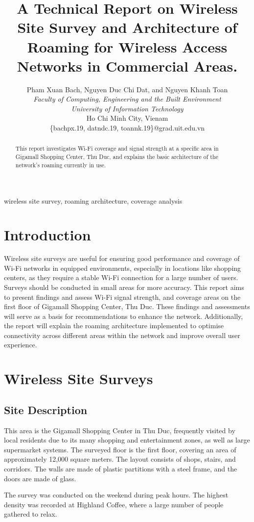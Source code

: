 \documentclass[conference]{IEEEtran}
\title{A Technical Report on Wireless Site Survey and Architecture of Roaming for Wireless Access Networks in Commercial Areas.}
\author{
    Pham Xuan Bach, Nguyen Duc Chi Dat, and Nguyen Khanh Toan\\
    \textit{Faculty of Computing, Engineering and the Built Environment } \\
    \textit{University of Information Technology} \\
    Ho Chi Minh City, Vienam \\
    \{bachpx.19, datndc.19, toannk.19\}@grad.uit.edu.vn
}
\begin{document}
\maketitle

\begin{abstract}
This report investigates Wi-Fi coverage and signal strength at a specific area in Gigamall Shopping Center, Thu Duc, and explains the basic architecture of the network's roaming currently in use.
\end{abstract}

\begin{IEEEkeywords}
wireless site survey, roaming architecture, coverage analysis
\end{IEEEkeywords}

\section{Introduction}
Wireless site surveys are useful for ensuring good performance and coverage of Wi-Fi networks in equipped environments, especially in locations like shopping centers, as they require a stable Wi-Fi connection for a large number of users. Surveys should be conducted in small areas for more accuracy. This report aims to present findings and assess Wi-Fi signal strength, and coverage areas on the first floor of Gigamall Shopping Center, Thu Duc. These findings and assessments will serve as a basis for recommendations to enhance the network. Additionally, the report will explain the roaming architecture implemented to optimise connectivity across different areas within the network and improve overall user experience.
\section{Wireless Site Surveys}

\subsection{Site Description}
This area is the Gigamall Shopping Center in Thu Duc, frequently visited by local residents due to its many shopping and entertainment zones, as well as large supermarket systems. The surveyed floor is the first floor, covering an area of approximately 12,000 square meters. The layout consists of shops, stairs, and corridors. The walls are made of plastic partitions with a steel frame, and the doors are made of glass.

The survey was conducted on the weekend during peak hours. The highest density was recorded at Highland Coffee, where a large number of people gathered to relax.
\end{document}

